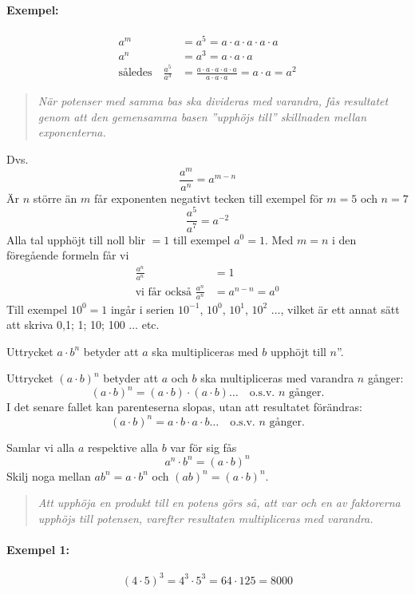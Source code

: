 \paragraph{Exempel:}
\begin{align*}
a^m &= a^5 = a \cdot a \cdot a \cdot a \cdot a \\
a^n &= a^3 = a \cdot a \cdot a \\
\text{således} \quad
\frac{a^5}{a^3}&=\frac{a \cdot a \cdot a \cdot a \cdot a}{a \cdot a \cdot a} =
a \cdot a = a^2
\end{align*}
\begin{quote}\emph{När potenser med samma bas ska divideras med varandra, fås
resultatet genom att den gemensamma basen ''upphöjs till'' skillnaden mellan
exponenterna.}\end{quote}
Dvs. \[\frac{a^m}{a^n} = a^{m-n}\]
Är \(n\) större än \(m\) får exponenten negativt tecken till exempel för \(m = 5\) och
\(n = 7\)
\[\frac{a^5}{a^7} = a^{-2}\]
Alla tal upphöjt till noll blir \(= 1\) till exempel \(a^0 = 1\).
Med \(m = n\) i den föregående formeln får vi
\begin{align*}
  \frac{a^n}{a^n} &= 1 \\
  \text{vi får också }\frac{a^n}{a^n} &= a^{n-n} =a^0
\end{align*}
Till exempel \(10^0 = 1\) ingår i serien \(10^{-1}\), \(10^0\), \(10^1\), \(10^2\)
\(\ldots\), vilket är ett annat sätt att skriva 0,1; 1; 10; 100 \(\ldots\) etc.

Uttrycket \(a \cdot b^n\) betyder att \(a\) ska multipliceras med \(b\) upphöjt
till \(n\)''.

Uttrycket \((a \cdot b)^n\) betyder att \(a\) och \(b\) ska multipliceras med
varandra \(n\) gånger:
\[
(a \cdot b)^n = (a \cdot b) \cdot (a \cdot b) \ldots
\quad \text{o.s.v. }n\text{ gånger.}
\]
I det senare fallet kan parenteserna slopas, utan att resultatet förändras:
\[
(a \cdot b)^n = a \cdot b \cdot a \cdot b \ldots
\quad \text{o.s.v. }n\text{ gånger.}
\]

Samlar vi alla \(a\) respektive alla \(b\) var för sig fås
\[a^n \cdot b^n = (a \cdot b)^n\]
Skilj noga mellan \(ab^n = a \cdot b^n\) och \((ab)^n = (a \cdot b)^n\).
\begin{quote}\emph{
Att upphöja en produkt till en potens görs så, att var och en av faktorerna
upphöjs till potensen, varefter resultaten multipliceras med varandra.
}\end{quote}
\paragraph{Exempel 1:}
\[
(4 \cdot 5)^3 = 4^3 \cdot 5^3 = 64 \cdot 125 = 8000
\]

